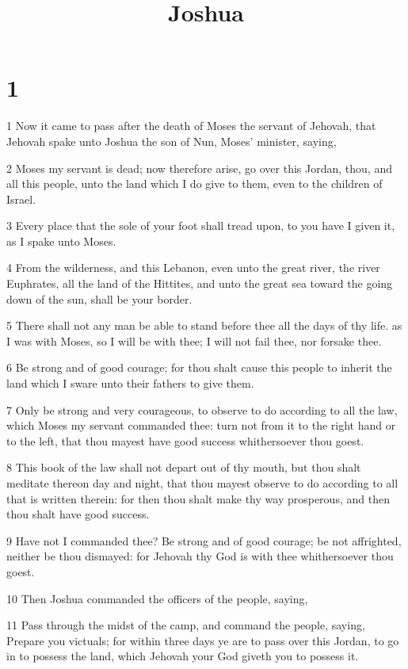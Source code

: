 

\title{Joshua}

\chapter{1}

\par 1 Now it came to pass after the death of Moses the servant of Jehovah, that Jehovah spake unto Joshua the son of Nun, Moses' minister, saying,
\par 2 Moses my servant is dead; now therefore arise, go over this Jordan, thou, and all this people, unto the land which I do give to them, even to the children of Israel.
\par 3 Every place that the sole of your foot shall tread upon, to you have I given it, as I spake unto Moses.
\par 4 From the wilderness, and this Lebanon, even unto the great river, the river Euphrates, all the land of the Hittites, and unto the great sea toward the going down of the sun, shall be your border.
\par 5 There shall not any man be able to stand before thee all the days of thy life. as I was with Moses, so I will be with thee; I will not fail thee, nor forsake thee.
\par 6 Be strong and of good courage; for thou shalt cause this people to inherit the land which I sware unto their fathers to give them.
\par 7 Only be strong and very courageous, to observe to do according to all the law, which Moses my servant commanded thee: turn not from it to the right hand or to the left, that thou mayest have good success whithersoever thou goest.
\par 8 This book of the law shall not depart out of thy mouth, but thou shalt meditate thereon day and night, that thou mayest observe to do according to all that is written therein: for then thou shalt make thy way prosperous, and then thou shalt have good success.
\par 9 Have not I commanded thee? Be strong and of good courage; be not affrighted, neither be thou dismayed: for Jehovah thy God is with thee whithersoever thou goest.
\par 10 Then Joshua commanded the officers of the people, saying,
\par 11 Pass through the midst of the camp, and command the people, saying, Prepare you victuals; for within three days ye are to pass over this Jordan, to go in to possess the land, which Jehovah your God giveth you to possess it.
